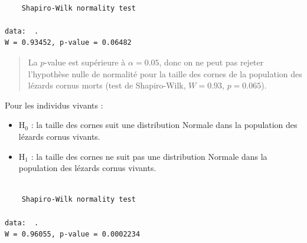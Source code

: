 \documentclass[a4paperpaper,]{article}
\newenvironment{Shaded}{\begin{snugshade}}{\end{snugshade}}
\newcommand{\KeywordTok}[1]{\textcolor[rgb]{0.12,0.11,0.11}{\textbf{#1}}}
\newcommand{\NormalTok}[1]{\textcolor[rgb]{0.12,0.11,0.11}{#1}}
\newcommand{\OperatorTok}[1]{\textcolor[rgb]{0.12,0.11,0.11}{#1}}
\newcommand{\StringTok}[1]{\textcolor[rgb]{0.75,0.01,0.01}{#1}}
\providecommand{\tightlist}{%
  \setlength{\itemsep}{0pt}\setlength{\parskip}{0pt}}
\begin{document}
\begin{Shaded}
\end{Shaded}

\begin{verbatim}

    Shapiro-Wilk normality test

data:  .
W = 0.93452, p-value = 0.06482
\end{verbatim}

\begin{quote}
La \(p\)-value est supérieure à \(\alpha = 0.05\), donc on ne peut pas rejeter l'hypothèse nulle de normalité pour la taille des cornes de la population des lézards cornus morts (test de Shapiro-Wilk, \(W = 0.93\), \(p = 0.065\)).
\end{quote}

Pour les individus vivants :

\begin{itemize}
\tightlist
\item
  H\(_0\) : la taille des cornes suit une distribution Normale dans la population des lézards cornus vivants.
\item
  H\(_1\) : la taille des cornes ne suit pas une distribution Normale dans la population des lézards cornus vivants.
\end{itemize}

\begin{Shaded}
\end{Shaded}

\begin{verbatim}

    Shapiro-Wilk normality test

data:  .
W = 0.96055, p-value = 0.0002234
\end{verbatim}
\end{document}
